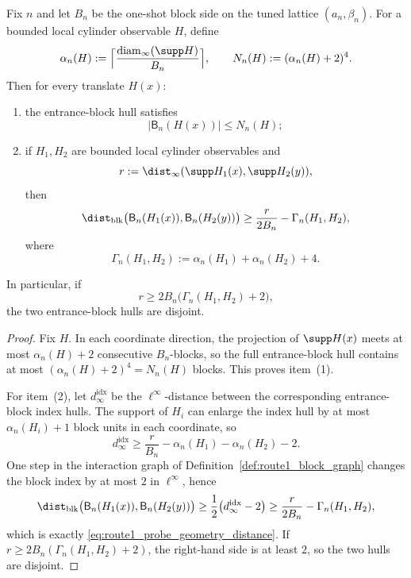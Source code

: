 \begin{lemma}\label{lem:route1_probe_geometry}
Fix $n$ and let $B_n$ be the one-shot block side on the tuned lattice $(a_n,\beta_n)$.
For a bounded local cylinder observable $H$, define
\[
\alpha_n(H):=\Bigl\lceil \frac{\operatorname{diam}_\infty(\supp H)}{B_n}\Bigr\rceil,
\qquad
N_n(H):=(\alpha_n(H)+2)^4.
\]
Then for every translate $H(x)$:
\begin{enumerate}[leftmargin=*]
\item the entrance-block hull satisfies
\[
|\mathsf B_n(H(x))|\le N_n(H);
\]
\item if $H_1,H_2$ are bounded local cylinder observables and
\[
r:=\dist_\infty(\supp H_1(x),\supp H_2(y)),
\]
then
\begin{equation}\label{eq:route1_probe_geometry_distance}
\dist_{\mathrm{blk}}\bigl(\mathsf B_n(H_1(x)),\mathsf B_n(H_2(y))\bigr)
\ge \frac{r}{2B_n}-\Gamma_n(H_1,H_2),
\end{equation}
where
\[
\Gamma_n(H_1,H_2):=\alpha_n(H_1)+\alpha_n(H_2)+4.
\]
\end{enumerate}
In particular, if
\[
r\ge 2B_n\bigl(\Gamma_n(H_1,H_2)+2\bigr),
\]
the two entrance-block hulls are disjoint.
\end{lemma}

\begin{proof}
Fix $H$.
In each coordinate direction, the projection of $\supp H(x)$ meets at most $\alpha_n(H)+2$ consecutive $B_n$-blocks, so the full entrance-block hull contains at most $(\alpha_n(H)+2)^4=N_n(H)$ blocks.
This proves item~(1).

For item~(2), let $d_{\infty}^{\mathrm{idx}}$ be the $\ell^\infty$-distance between the corresponding entrance-block index hulls.
The support of $H_i$ can enlarge the index hull by at most $\alpha_n(H_i)+1$ block units in each coordinate, so
\[
d_{\infty}^{\mathrm{idx}}
\ge \frac{r}{B_n}-\alpha_n(H_1)-\alpha_n(H_2)-2.
\]
One step in the interaction graph of Definition~\ref{def:route1_block_graph} changes the block index by at most $2$ in $\ell^\infty$, hence
\[
\dist_{\mathrm{blk}}\bigl(\mathsf B_n(H_1(x)),\mathsf B_n(H_2(y))\bigr)
\ge \frac12\bigl(d_{\infty}^{\mathrm{idx}}-2\bigr)
\ge \frac{r}{2B_n}-\Gamma_n(H_1,H_2),
\]
which is exactly \eqref{eq:route1_probe_geometry_distance}.
If $r\ge 2B_n(\Gamma_n(H_1,H_2)+2)$, the right-hand side is at least $2$, so the two hulls are disjoint.
\end{proof}

